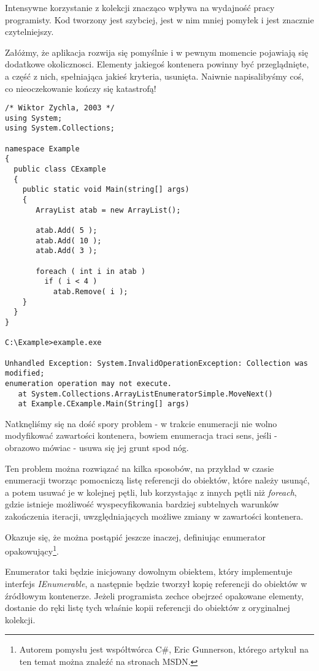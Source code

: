 Intensywne korzystanie z kolekcji znacząco wpływa na wydajność pracy programisty. Kod tworzony jest szybciej,
jest w nim mniej pomyłek i jest znacznie czytelniejszy.

Załóżmy, że aplikacja rozwija się pomyślnie i w pewnym momencie pojawiają się dodatkowe okolicznosci.
Elementy jakiegoś kontenera powinny być przeglądnięte, 
a część z nich, spełniająca jakieś kryteria, usunięta. Naiwnie
napisalibyśmy coś, co nieoczekowanie kończy się katastrofą!

\begin{scriptsize}
\begin{verbatim}
/* Wiktor Zychla, 2003 */
using System;
using System.Collections;

namespace Example
{
  public class CExample 
  {
    public static void Main(string[] args)
    {
       ArrayList atab = new ArrayList();		

       atab.Add( 5 );
       atab.Add( 10 );
       atab.Add( 3 );

       foreach ( int i in atab )
         if ( i < 4 )
           atab.Remove( i );
    }
  }
}

C:\Example>example.exe

Unhandled Exception: System.InvalidOperationException: Collection was modified;
enumeration operation may not execute.
   at System.Collections.ArrayListEnumeratorSimple.MoveNext()
   at Example.CExample.Main(String[] args)
\end{verbatim}
\end{scriptsize}

Natknęliśmy się na dość spory problem - w trakcie enumeracji nie wolno modyfikować zawartości
kontenera, bowiem enumeracja traci sens, jeśli - obrazowo mówiac - usuwa się jej grunt spod nóg.

Ten problem można rozwiązać na kilka sposobów, na przykład w czasie enumeracji tworząc 
pomocniczą listę referencji do obiektów, które należy usunąć, a potem usuwać je w kolejnej pętli, lub
korzystając z innych pętli niż {\em foreach}, gdzie istnieje możliwość wyspecyfikowania bardziej subtelnych
warunków zakończenia iteracji, uwzględniających możliwe zmiany w zawartości kontenera.

Okazuje się, że można postąpić jeszcze inaczej, definiując enumerator 
opakowujący\footnote{Autorem pomysłu jest współtwórca C\#, Eric Gunnerson, którego artykuł na ten temat
można znaleźć na stronach MSDN.}. 

Enumerator taki będzie inicjowany dowolnym obiektem, który implementuje interfejs {\em IEnumerable}, 
a następnie będzie tworzył kopię referencji do obiektów w źródłowym kontenerze. Jeżeli programista
zechce obejrzeć opakowane elementy, dostanie do ręki listę tych właśnie kopii referencji do obiektów
z oryginalnej kolekcji.

